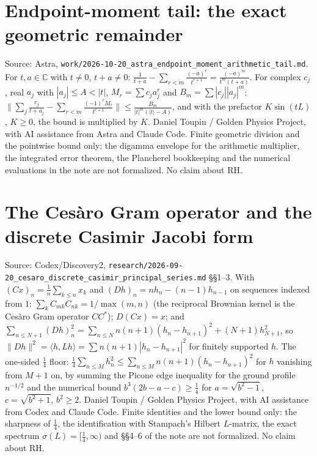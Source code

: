 \documentclass{report}
\theoremstyle{definition}
\begin{document}
\begin{itemize}
\begin{itemize}
\section{Endpoint-moment tail: the exact geometric remainder}
Source: Astra, \texttt{work/2026-10-20\_astra\_endpoint\_moment\_arithmetic\_tail.md}. For $t,a\in\mathbb C$ with $t\ne0$, $t+a\ne0$: $\frac1{t+a}-\sum_{r<m}\frac{(-a)^r}{t^{r+1}}=\frac{(-a)^m}{t^m(t+a)}$. For complex $c_j$, real $a_j$ with $|a_j|\le A<|t|$,
$M_r=\sum c_ja_j^r$ and $B_m=\sum|c_j||a_j|^m$: $\bigl\|\sum_j\frac{c_j}{t+a_j}-\sum_{r<m}\frac{(-1)^rM_r}{t^{r+1}}\bigr\|\le\frac{B_m}{|t|^m(|t|-A)}$, and with the prefactor $K\sin(tL)$, $K\ge0$, the bound is multiplied by $K$.
Daniel Toupin / Golden Physics Project, with AI assistance from Astra and Claude Code. Finite geometric division and the pointwise bound only: the digamma envelope for the arithmetic multiplier, the integrated error theorem, the Plancherel bookkeeping and the numerical evaluations in the note are not formalized. No claim about RH.

\section{The Ces\`aro Gram operator and the discrete Casimir Jacobi form}
Source: Codex/Discovery2, \texttt{research/2026-09-20\_cesaro\_discrete\_casimir\_principal\_series.md} \S\S1--3. With $(Cx)_n=\frac1n\sum_{k\le n}x_k$ and $(Dh)_n=nh_n-(n-1)h_{n-1}$ on sequences indexed from $1$:
$\sum_kC_{mk}C_{nk}=1/\max(m,n)$ (the reciprocal Brownian kernel is the Ces\`aro Gram operator $CC^*$); $D(Cx)=x$; and $\sum_{n\le N+1}(Dh)_n^2=\sum_{n\le N}n(n+1)(h_n-h_{n+1})^2+(N+1)h_{N+1}^2$, so $\|Dh\|^2=\langle h,Lh\rangle=\sum n(n+1)|h_n-h_{n+1}|^2$ for finitely supported $h$.
The one-sided $\tfrac14$ floor: $\tfrac14\sum_{n\le M}h_n^2\le\sum_{n\le M}n(n+1)(h_n-h_{n+1})^2$ for $h$ vanishing from $M+1$ on, by summing the Picone edge inequality for the ground profile $n^{-1/2}$ and the numerical bound $b^3(2b-a-c)\ge\tfrac14$ for $a=\sqrt{b^2-1}$, $c=\sqrt{b^2+1}$, $b^2\ge2$.
Daniel Toupin / Golden Physics Project, with AI assistance from Codex and Claude Code. Finite identities and the lower bound only: the sharpness of $\tfrac14$, the identification with Stampach's Hilbert $L$-matrix, the exact spectrum $\sigma(L)=[\tfrac14,\infty)$ and \S\S4--6 of the note are not formalized. No claim about RH.


\end{itemize}
\end{itemize}
\end{document}
